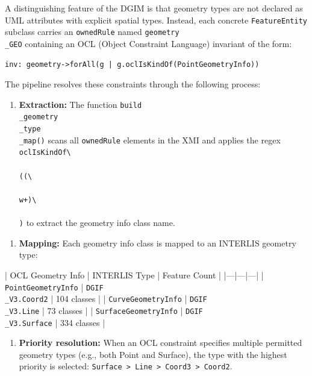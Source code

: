 \documentclass[conference]{IEEEtran}
\begin{document}
A distinguishing feature of the DGIM is that geometry types are not declared as UML attributes with explicit spatial types. Instead, each concrete \texttt{FeatureEntity} subclass carries an \texttt{ownedRule} named \texttt{geometry\\_GEO} containing an OCL (Object Constraint Language) invariant of the form:

\begin{lstlisting}
inv: geometry->forAll(g | g.oclIsKindOf(PointGeometryInfo))
\end{lstlisting}


The pipeline resolves these constraints through the following process:

\begin{enumerate}[leftmargin=*]
\item \textbf{Extraction:} The function \texttt{build\\_geometry\\_type\\_map()} scans all \texttt{ownedRule} elements in the XMI and applies the regex \texttt{oclIsKindOf\textbackslash\\{\\}((\textbackslash\\{\\}w+)\textbackslash\\{\\})} to extract the geometry info class name.
\end{enumerate}

\begin{enumerate}[leftmargin=*]
\item \textbf{Mapping:} Each geometry info class is mapped to an INTERLIS geometry type:
\end{enumerate}

   | OCL Geometry Info | INTERLIS Type | Feature Count |
   |---|---|---|
   | \texttt{PointGeometryInfo} | \texttt{DGIF\\_V3.Coord2} | 104 classes |
   | \texttt{CurveGeometryInfo} | \texttt{DGIF\\_V3.Line} | 73 classes |
   | \texttt{SurfaceGeometryInfo} | \texttt{DGIF\\_V3.Surface} | 334 classes |

\begin{enumerate}[leftmargin=*]
\item \textbf{Priority resolution:} When an OCL constraint specifies multiple permitted geometry types (e.g., both Point and Surface), the type with the highest priority is selected: \texttt{Surface > Line > Coord3 > Coord2}.
\end{enumerate}
\end{document}

